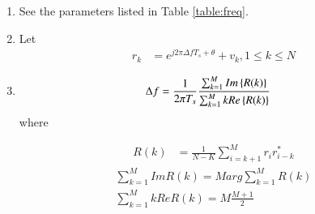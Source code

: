 \begin{enumerate}[label=\thesubsection.\arabic*.,ref=\thesubsection.\theenumi]


\item See the parameters listed in Table \ref{table:freq}.
\item 	Let
\begin{align}
r_k &= e^{j2\pi \Delta fT_s + \theta}	+ v_k, 
1\leq k \leq N
\label{eq:freq_rx}
\end{align}

%	
\item %
	\begin{align}
	\Delta f &= \frac{1}{2\pi T_s}\frac{\sum_{k=1}^{M} Im\left\{R(k)\right\}}{\sum_{k=1}^{M} kRe\left\{R(k)\right\}}
	\end{align}
where
	
	
	
	\begin{align}
	R(k) &= \frac{1}{N-K}{\sum_{i = k+1}^{M} r_ir_{i-k}^*}	
	\end{align}
\begin{align}
    \sum_{k=1}^{M} Im{R(k)} = M arg{\sum_{k=1}^{M} {R(k)}}
    \\
    \sum_{k=1}^{M} kRe{R(k)} = M\frac{M+1}{2}
	\end{align}
\end{enumerate}

